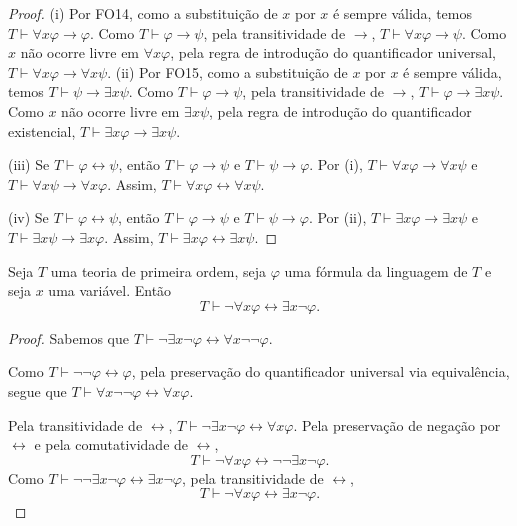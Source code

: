 \begin{proof}
    (i) Por FO14, como a substituição de $x$ por $x$ é sempre válida, temos $T\vdash \forall x\varphi\rightarrow\varphi$.
    Como $T\vdash \varphi\rightarrow\psi$, pela transitividade de $\rightarrow$, $T\vdash \forall x\varphi\rightarrow\psi$.
    Como $x$ não ocorre livre em $\forall x\varphi$, pela regra de introdução do quantificador universal, $T\vdash \forall x\varphi\rightarrow\forall x\psi$.
    (ii) Por FO15, como a substituição de $x$ por $x$ é sempre válida, temos $T\vdash \psi\rightarrow\exists x\psi$.
    Como $T\vdash \varphi\rightarrow\psi$, pela transitividade de $\rightarrow$, $T\vdash \varphi\rightarrow\exists x\psi$.
    Como $x$ não ocorre livre em $\exists x\psi$, pela regra de introdução do quantificador existencial, $T\vdash \exists x\varphi\rightarrow\exists x\psi$.

    (iii) Se $T\vdash \varphi\leftrightarrow\psi$, então $T\vdash \varphi\rightarrow\psi$ e $T\vdash \psi\rightarrow\varphi$.
    Por (i), $T\vdash \forall x\varphi\rightarrow\forall x\psi$ e $T\vdash \forall x\psi\rightarrow\forall x\varphi$.
    Assim, $T\vdash \forall x\varphi\leftrightarrow\forall x\psi$.

    (iv) Se $T\vdash \varphi\leftrightarrow\psi$, então $T\vdash \varphi\rightarrow\psi$ e $T\vdash \psi\rightarrow\varphi$.
    Por (ii), $T\vdash \exists x\varphi\rightarrow\exists x\psi$ e $T\vdash \exists x\psi\rightarrow\exists x\varphi$.
    Assim, $T\vdash \exists x\varphi\leftrightarrow\exists x\psi$.
\end{proof}

\begin{metacorollary}\label{mprop:negacaoQuantificadores2}
    Seja $T$ uma teoria de primeira ordem, seja $\varphi$ uma fórmula da linguagem de $T$ e seja $x$ uma variável.
    Então
    \[
        T\vdash \neg \forall x\varphi\leftrightarrow\exists x\neg \varphi.
    \]
\end{metacorollary}

\begin{proof}
    Sabemos que $T\vdash \neg\exists x\neg \varphi \leftrightarrow \forall x\neg\neg\varphi$.
    
    Como $T\vdash \neg\neg\varphi\leftrightarrow\varphi$, pela preservação do quantificador universal via equivalência, segue que $T\vdash \forall x\neg\neg\varphi\leftrightarrow\forall x\varphi$.

    Pela transitividade de $\leftrightarrow$, $T\vdash \neg\exists x\neg \varphi \leftrightarrow \forall x\varphi$.
    Pela preservação de negação por $\leftrightarrow$ e pela comutatividade de $\leftrightarrow$,
    \[
        T\vdash \neg\forall x\varphi \leftrightarrow \neg\neg\exists x\neg\varphi.
    \]
    Como $T\vdash \neg\neg\exists x\neg\varphi\leftrightarrow\exists x\neg\varphi$, pela transitividade de $\leftrightarrow$,
    \[
        T\vdash \neg\forall x\varphi \leftrightarrow \exists x\neg \varphi.
    \]
\end{proof}


